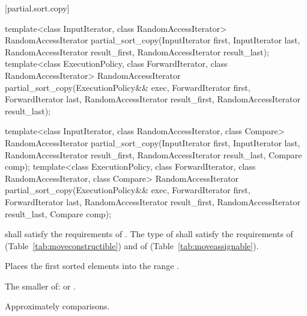 [partial.sort.copy]{}

%
\begin{itemdecl}
template<class InputIterator, class RandomAccessIterator>
  RandomAccessIterator
    partial_sort_copy(InputIterator first, InputIterator last,
                      RandomAccessIterator result_first,
                      RandomAccessIterator result_last);
template<class ExecutionPolicy, class ForwardIterator, class RandomAccessIterator>
  RandomAccessIterator
    partial_sort_copy(ExecutionPolicy&& exec,
                      ForwardIterator first, ForwardIterator last,
                      RandomAccessIterator result_first,
                      RandomAccessIterator result_last);

template<class InputIterator, class RandomAccessIterator,
         class Compare>
  RandomAccessIterator
    partial_sort_copy(InputIterator first, InputIterator last,
                      RandomAccessIterator result_first,
                      RandomAccessIterator result_last,
                      Compare comp);
template<class ExecutionPolicy, class ForwardIterator, class RandomAccessIterator,
         class Compare>
  RandomAccessIterator
    partial_sort_copy(ExecutionPolicy&& exec,
                      ForwardIterator first, ForwardIterator last,
                      RandomAccessIterator result_first,
                      RandomAccessIterator result_last,
                      Compare comp);
\end{itemdecl}

\begin{itemdescr}
\pnum
\requires
{} shall satisfy the requirements of
. The type
of  shall satisfy the requirements of
 (Table~\ref{tab:moveconstructible}) and of
 (Table~\ref{tab:moveassignable}).

\pnum
\effects
Places the first
sorted elements into the range
.

\pnum
\returns
The smaller of:
 or
.

\pnum
\complexity
Approximately
comparisons.
\end{itemdescr}

